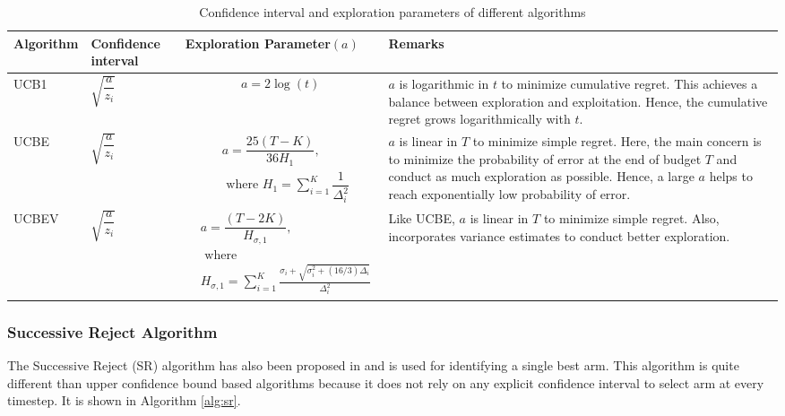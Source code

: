 \begin{table}
\caption{Confidence interval and exploration parameters of different algorithms}
\label{table:comp-exp}
\begin{center}
\begin{tabular}{|p{5em}|p{4em}|p{11em}|p{11em}|}
\hline
Algorithm  &  Confidence interval & Exploration Parameter$(a)$ & Remarks \\
\hline
\hline
UCB1       & $\sqrt{\dfrac{a}{z_i}}$ & \begin{align*}a = 2\log (t)\end{align*} & $a$ is logarithmic in $t$ to minimize cumulative regret. This achieves a balance between exploration and exploitation. Hence, the cumulative regret grows logarithmically with $t$. \\%
\hline
\hline
UCBE       & $\sqrt{\dfrac{a}{z_i}}$ & {\begin{align*}& a = \dfrac{25(T-K)}{36 H_1},\\& \text{ where }H_1 = \sum_{i=1}^{K}\dfrac{1}{\Delta_i^2} 
\end{align*} }
& $a$ is linear in $T$ to minimize simple regret. Here, the main concern is to minimize the probability of error at the end of budget $T$ and conduct as much exploration as possible. Hence, a large $a$ helps to reach exponentially low probability of error.\\
\hline
\hline
UCBEV      & $\sqrt{\dfrac{a}{z_i}}$ & {\begin{align*} & a = \dfrac{(T-2K)}{H_{\sigma,1}},\\ &\text{ where } \\  & H_{\sigma,1}=\sum_{i=1}^{K}\frac{\sigma_{i}+\sqrt{\sigma_{i}^{2}+(16/3)\Delta_{i}}}{\Delta_{i}^{2}} 
\end{align*}}
& Like UCBE, $a$ is linear in $T$ to minimize simple regret. Also, incorporates variance estimates to conduct better exploration.\\\midrule
\end{tabular}
\end{center}
\end{table}


\subsubsection{Successive Reject Algorithm}

The Successive Reject (SR) algorithm has also been proposed in \citet{audibert2010best} and is used for identifying a single best arm. This algorithm is quite different than upper confidence bound based algorithms because it does not rely on any explicit confidence interval to select arm at every timestep. It is shown in Algorithm \ref{alg:sr}.


